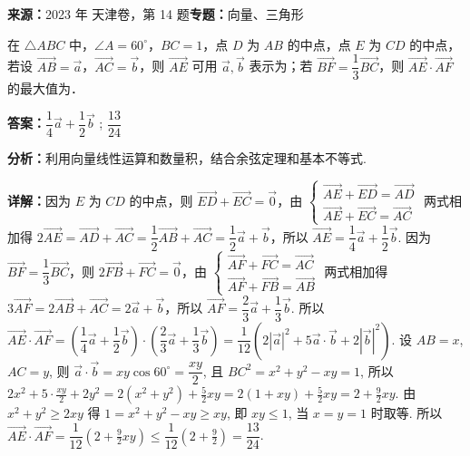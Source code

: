 \begin{question}[points=5]
\textbf{来源：}2023 年 天津卷，第 14 题\quad \textbf{专题：}向量、三角形\par
在 $\triangle ABC$ 中，$\angle A = 60^\circ$，$BC = 1$，点 $D$ 为 $AB$ 的中点，点 $E$ 为 $CD$ 的中点，若设 $\overrightarrow{AB} = \vec{a}$，$\overrightarrow{AC} = \vec{b}$，则 $\overrightarrow{AE}$ 可用 $\vec{a}, \vec{b}$ 表示为；若 $\overrightarrow{BF} = \dfrac{1}{3} \overrightarrow{BC}$，则 $\overrightarrow{AE} \cdot \overrightarrow{AF}$ 的最大值为．
\begin{solution}
\textbf{答案：}$\dfrac{1}{4}\vec{a} + \dfrac{1}{2}\vec{b}$ ; $\dfrac{13}{24}$

\textbf{分析：}利用向量线性运算和数量积，结合余弦定理和基本不等式.

\textbf{详解：}因为 $E$ 为 $CD$ 的中点，则 $\overrightarrow{ED} + \overrightarrow{EC} = \vec{0}$，由 $\begin{cases} \overrightarrow{AE} + \overrightarrow{ED} = \overrightarrow{AD} \\ \overrightarrow{AE} + \overrightarrow{EC} = \overrightarrow{AC} \end{cases}$ 两式相加得 $2\overrightarrow{AE} = \overrightarrow{AD} + \overrightarrow{AC} = \dfrac{1}{2}\overrightarrow{AB} + \overrightarrow{AC} = \dfrac{1}{2}\vec{a} + \vec{b}$，所以 $\overrightarrow{AE} = \dfrac{1}{4}\vec{a} + \dfrac{1}{2}\vec{b}$. 因为 $\overrightarrow{BF} = \dfrac{1}{3}\overrightarrow{BC}$，则 $2\overrightarrow{FB} + \overrightarrow{FC} = \vec{0}$，由 $\begin{cases} \overrightarrow{AF} + \overrightarrow{FC} = \overrightarrow{AC} \\ \overrightarrow{AF} + \overrightarrow{FB} = \overrightarrow{AB} \end{cases}$ 两式相加得 $3\overrightarrow{AF} = 2\overrightarrow{AB} + \overrightarrow{AC} = 2\vec{a} + \vec{b}$，所以 $\overrightarrow{AF} = \dfrac{2}{3}\vec{a} + \dfrac{1}{3}\vec{b}$. 所以 $\overrightarrow{AE} \cdot \overrightarrow{AF} = \left(\dfrac{1}{4}\vec{a} + \dfrac{1}{2}\vec{b}\right) \cdot \left(\dfrac{2}{3}\vec{a} + \dfrac{1}{3}\vec{b}\right) = \dfrac{1}{12}(2|\vec{a}|^2 + 5\vec{a}\cdot\vec{b} + 2|\vec{b}|^2)$. 设 $AB = x$, $AC = y$, 则 $\vec{a}\cdot\vec{b} = xy\cos60^\circ = \dfrac{xy}{2}$, 且 $BC^2 = x^2 + y^2 - xy = 1$, 所以 $2x^2 + 5\cdot\frac{xy}{2} + 2y^2 = 2(x^2 + y^2) + \frac{5}{2}xy = 2(1+xy) + \frac{5}{2}xy = 2 + \frac{9}{2}xy$. 由 $x^2 + y^2 \ge 2xy$ 得 $1 = x^2 + y^2 - xy \ge xy$, 即 $xy \le 1$, 当 $x = y = 1$ 时取等. 所以 $\overrightarrow{AE} \cdot \overrightarrow{AF} = \dfrac{1}{12}\left(2 + \frac{9}{2}xy\right) \le \dfrac{1}{12}\left(2 + \frac{9}{2}\right) = \dfrac{13}{24}$.
\end{solution}
\end{question}


